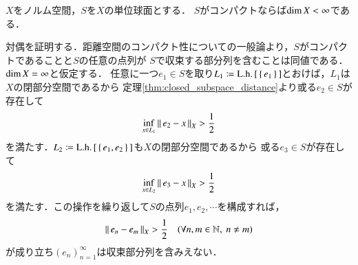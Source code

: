 	\begin{prf}
		
	\end{prf}
	
	\begin{screen}
		\begin{thm}[単位球面がコンパクトなら有限次元]
			$X$をノルム空間，$S$を$X$の単位球面とする．
			$S$がコンパクトならば$\operatorname{dim} X < \infty$である．
		\end{thm}
	\end{screen}
	
	\begin{prf}
		対偶を証明する．距離空間のコンパクト性についての一般論より，$S$がコンパクトであることと$S$の任意の点列が
		$S$で収束する部分列を含むことは同値である．$\operatorname{dim} X = \infty$と仮定する．
		任意に一つ$e_1 \in S$を取り$L_1 \coloneqq \mathrm{L.h.}\left[\, \{\, e_1\, \}\, \right]$とおけば，$L_1$は$X$の閉部分空間であるから
		定理\ref{thm:closed_subspace_distance}より或る$e_2 \in S$が存在して
		\begin{align}
			\operatorname*{inf}_{x \in L_1} \left\|\, e_2 - x\, \right\|_{X} > \frac{1}{2}
		\end{align}
		を満たす．$L_2 \coloneqq \mathrm{L.h.}\left[\, \{\, e_1,e_2\, \}\, \right]$も$X$の閉部分空間であるから
		或る$e_3 \in S$が存在して
		\begin{align}
			\operatorname*{inf}_{x \in L_2} \left\|\, e_3 - x\, \right\|_{X} > \frac{1}{2}
		\end{align}
		を満たす．この操作を繰り返して$S$の点列$e_1,e_2,\cdots$を構成すれば，
		\begin{align}
			\left\|\, e_n - e_m\, \right\|_{X} > \frac{1}{2} \quad (\forall n,m \in \mathbb{N},\ n \neq m)
		\end{align}
		が成り立ち$\left( e_n \right)_{n=1}^{\infty}$は収束部分列を含みえない．
		\QED
	\end{prf}